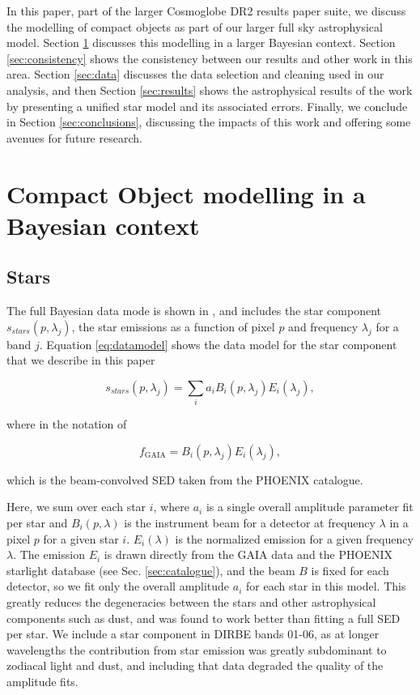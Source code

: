 \documentclass{aa}
\begin{document}
In this paper, part of the larger Cosmoglobe DR2 results paper suite, we discuss the modelling of compact objects as part of our larger full sky astrophysical model. Section \ref{sec:models} discusses this modelling in a larger Bayesian context. Section \ref{sec:consistency} shows the consistency between our results and other work in this area. Section \ref{sec:data} discusses the data selection and cleaning used in our analysis, and then Section \ref{sec:results} shows the astrophysical results of the work by presenting a unified star model and its associated errors. Finally, we conclude in Section \ref{sec:conclusions}, discussing the impacts of this work and offering some avenues for future research.

\section{Compact Object modelling in a Bayesian context}
\label{sec:models}

\subsection{Stars}

The full Bayesian data mode is shown in \cite{CG02_01}, and includes the star component $s_{stars}(p, \lambda_j)$, the star emissions as a function of pixel $p$ and frequency $\lambda_j$ for a band $j$. Equation \ref{eq:datamodel} shows the data model for the star component that we describe in this paper

\begin{equation}
s_{stars}(p, \lambda_j) = \sum_i a_i B_i(p, \lambda_j) E_i(\lambda_j),
\label{eq:datamodel}
\end{equation}

where in the notation of \cite{CG02_01} 

\begin{equation}
f_{\mathrm{GAIA}} = B_i(p, \lambda_j) E_i(\lambda_j),
\label{eq:datamodel}
\end{equation}

which is the beam-convolved SED taken from the PHOENIX catalogue.

Here, we sum over each star $i$, where $a_i$ is a single overall amplitude parameter fit per star and $B_i(p, \lambda)$ is the instrument beam for a detector at frequency $\lambda$ in a pixel $p$ for a given star $i$. $E_i(\lambda)$ is the normalized emission for a given frequency $\lambda$. The emission $E_i$ is drawn directly from the GAIA data and the PHOENIX starlight database (see Sec. \ref{sec:catalogue}), and the beam $B$ is fixed for each detector, so we fit only the overall amplitude $a_i$ for each star in this model. This greatly reduces the degeneracies between the stars and other astrophysical components such as dust, and was found to work better than fitting a full SED per star. We include a star component in DIRBE bands 01-06, as at longer wavelengths the contribution from star emission was greatly subdominant to zodiacal light and dust, and including that data degraded the quality of the amplitude fits. 
\end{document}
